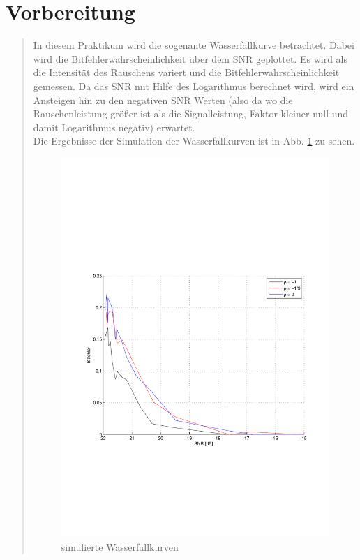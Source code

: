 \section{Vorbereitung}
\begin{quote}
       In diesem Praktikum wird die sogenante Wasserfallkurve betrachtet. Dabei wird die Bitfehlerwahrscheinlichkeit
       über dem SNR geplottet. Es wird als die Intensität des Rauschens variert und die Bitfehlerwahrscheinlichkeit
       gemessen. Da das SNR mit Hilfe des Logarithmus berechnet wird, wird ein Ansteigen hin zu den negativen SNR Werten
       (also da wo die Rauschenleistung größer ist als die Signalleistung, Faktor kleiner null und damit Logarithmus
       negativ) erwartet. \\
       Die Ergebnisse der Simulation der Wasserfallkurven ist in Abb. \ref{fig:simu_Wasser} zu sehen.
  
       \begin{figure}[H]
        \centering
        \includegraphics[scale=0.7, trim = 2cm 7cm 1cm 8cm, clip]{Bilder/Simulation_Wasserfall}
          \caption{simulierte Wasserfallkurven}
        \label{fig:simu_Wasser}
       \end{figure}
       

\end{quote}
